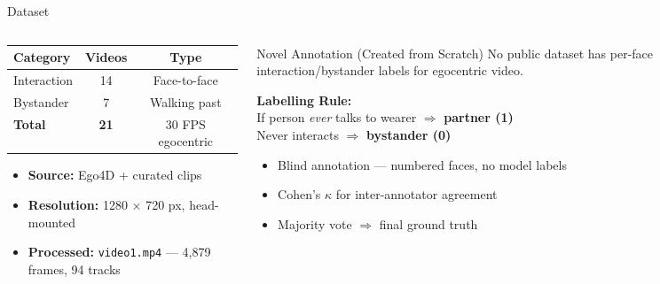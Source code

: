 \documentclass[aspectratio=169]{beamer}
\begin{document}
\begin{frame}{Dataset}
\begin{columns}[T]
\begin{column}{0.48\textwidth}
  \begin{table}
    \renewcommand{\arraystretch}{1.5}
    \begin{tabular}{lcc}
    \toprule
    \textbf{Category} & \textbf{Videos} & \textbf{Type} \\
    \midrule
    Interaction & 14 & Face-to-face \\
    Bystander   &  7 & Walking past \\
    \midrule
    \textbf{Total} & \textbf{21} & 30 FPS egocentric \\
    \bottomrule
    \end{tabular}
  \end{table}
  \vspace{0.4cm}
  \begin{itemize}\setlength{\itemsep}{0.28cm}
    \item \textbf{Source:} Ego4D + curated clips
    \item \textbf{Resolution:} 1280 $\times$ 720 px, head-mounted
    \item \textbf{Processed:} \texttt{video1.mp4} — 4,879 frames, 94 tracks
  \end{itemize}
\end{column}
\begin{column}{0.48\textwidth}
  \begin{alertblock}{Novel Annotation (Created from Scratch)}
    No public dataset has per-face interaction/bystander labels for egocentric video.
  \end{alertblock}
  \vspace{0.35cm}
  \textbf{Labelling Rule:}\\
  If person \textit{ever} talks to wearer $\Rightarrow$ \textbf{partner (1)}\\
  Never interacts $\Rightarrow$ \textbf{bystander (0)}
  \vspace{0.35cm}
  \begin{itemize}\setlength{\itemsep}{0.2cm}
    \item Blind annotation — numbered faces, no model labels
    \item Cohen's $\kappa$ for inter-annotator agreement
    \item Majority vote $\Rightarrow$ final ground truth
  \end{itemize}
\end{column}
\end{columns}
\end{frame}
\end{document}
